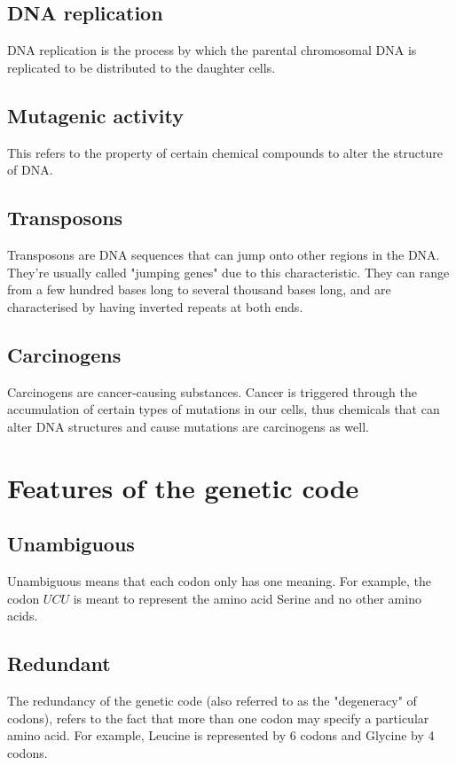 \documentclass[11pt]{article}
\begin{document}
\subsection{DNA replication}
\label{sec:org55e367a}
DNA replication is the process by which the parental chromosomal DNA is replicated to be distributed to the daughter cells.

\subsection{Mutagenic activity}
\label{sec:org9a76e6f}
This refers to the property of certain chemical compounds to alter the structure of DNA.

\subsection{Transposons}
\label{sec:orgbf3ecc5}
Transposons are DNA sequences that can jump onto other regions in the DNA. They're usually called "jumping genes" due to this characteristic. They can range from a few hundred bases long to several thousand bases long, and are characterised by having inverted repeats at both ends.

\subsection{Carcinogens}
\label{sec:org4e6b120}
Carcinogens are cancer-causing substances. Cancer is triggered through the accumulation of certain types of mutations in our cells, thus chemicals that can alter DNA structures and cause mutations are carcinogens as well.

\newpage

\section{Features of the genetic code}
\label{sec:org131bda5}

\subsection{Unambiguous}
\label{sec:org71b0696}
Unambiguous means that each codon only has one meaning. For example, the codon \(UCU\) is meant to represent the amino acid Serine and no other amino acids.

\subsection{Redundant}
\label{sec:orgc7075f9}
The redundancy of the genetic code (also referred to as the "degeneracy" of codons), refers to the fact that more than one codon may specify a particular amino acid. For example, Leucine is represented by 6 codons and Glycine by 4 codons.
\end{document}
